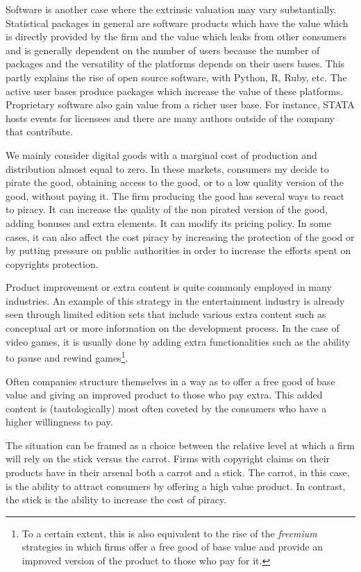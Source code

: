 Software is another case where the extrinsic valuation may vary substantially. Statistical packages in general are software products which have the value which is directly provided by the firm and the value which leaks from other consumers and is generally dependent on the number of users because the number of packages and the versatility of the platforms depends on their users bases. This partly explains the rise of open source software, with Python, R, Ruby, etc.  The active user bases produce packages which increase the value of these platforms. Proprietary software also gain value from a richer user base. For instance, STATA hosts events for licensees and there are many authors outside of the company that contribute.

We mainly consider digital goods with a marginal cost of production and distribution almost equal to zero. In these markets, consumers my decide to pirate the good, obtaining access to the good, or to a low quality version of the good, without paying it. The firm producing the good has several ways to react to piracy. It can increase the quality of the non pirated version of the good, adding bonuses and extra elements. It can modify its pricing policy. In some cases, it can also affect the cost piracy by increasing the protection of the good or by putting pressure on public authorities in order to increase the efforts spent on copyrights protection. 

Product improvement or extra content is quite commonly employed in many industries. An example of this strategy in the entertainment industry is already seen through limited edition sets that include various extra content such as conceptual art or more information on the development process. In the case of video games, it is usually done by adding extra functionalities such as the ability to pause and rewind games\footnote{To a certain extent, this is also equivalent to the rise of the \textit{freemium} strategies in which firms offer a free good of base value and provide an improved version of the product to those who pay for it.}.


Often companies structure themselves in a way as to offer a free good of base value and giving an improved product to those who pay extra. This added content is (tautologically) most often coveted by the consumers who have a higher willingness to pay.

The situation can be framed as a choice between the relative level at which a firm will rely on the stick versus the carrot. Firms with copyright claims on their products have in their arsenal both a carrot and a stick. The carrot, in this case, is the ability to attract consumers by offering a high value product. In contrast, the stick is the ability to increase the cost of piracy.


